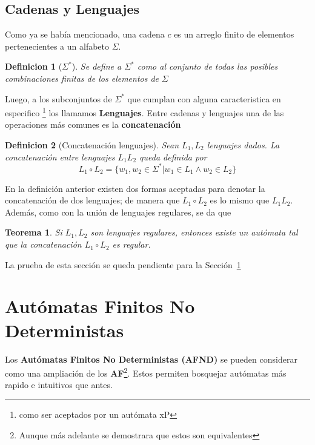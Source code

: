 \documentclass[12pt]{book}
\newtheorem{teorema}{Teorema}[section]
\newtheorem{definicion}{Definicion}[part]
\begin{document}
		\subsection{Cadenas y Lenguajes}
		
		\par Como ya se hab\'ia mencionado, una cadena $c$ es un arreglo finito de elementos pertenecientes a un alfabeto $\Sigma$.
		
		\begin{definicion}[$\Sigma^*$]
			Se define a $\Sigma^*$ como al conjunto de todas las posibles combinaciones finitas de los elementos de $\Sigma$
		\end{definicion}
		
		\par Luego, a los subconjuntos de $\Sigma^*$ que cumplan con alguna caracteristica en especifico \footnote{como ser aceptados por un aut\'omata xP} los llamamos \textbf{Lenguajes}. Entre cadenas y lenguajes una de las operaciones m\'as comunes es la \textbf{concatenaci\'on}
		
		\begin{definicion}[Concatenaci\'on lenguajes]
			Sean $L_1, L_2$ lenguajes dados. La concatenaci\'on entre lenguajes $L_1L_2$ queda definida por
			$$ L_1\circ L_2 = \{ w_1, w_2 \in \Sigma^* | w_1\in L_1 \wedge w_2\in L_2\}$$
		\end{definicion}
		
		En la definici\'on anterior existen dos formas aceptadas para denotar la concatenaci\'on de dos lenguajes; de manera que $L_1\circ L_2$ es lo mismo que $L_1 L_2$. Adem\'as, como con la uni\'on de lenguajes regulares, se da que
		
		\begin{teorema}
			Si $L_1, L_2$ son lenguajes regulares, entonces existe un aut\'omata tal que la concatenaci\'on $L_1\circ L_2$ es regular.
		\end{teorema}
	
		La prueba de esta secci\'on se queda pendiente para la Secci\'on~\ref{sec: AFND}



	\section{Aut\'omatas Finitos No Deterministas} \label{sec: AFND}
	
	\par Los \textbf{Aut\'omatas Finitos No Deterministas (AFND)} se pueden considerar como una ampliaci\'on de los \textbf{AF}\footnote{Aunque m\'as adelante se demostrara que estos son equivalentes}. Estos permiten bosquejar aut\'omatas m\'as rapido e intuitivos que antes.
	
\end{document}
